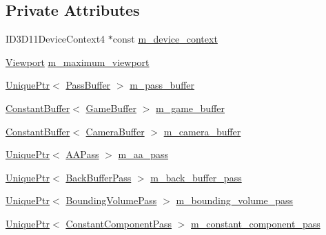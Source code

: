 \subsection*{Private Attributes}
\begin{DoxyCompactItemize}
\item 
I\+D3\+D11\+Device\+Context4 $\ast$const \hyperlink{classmage_1_1_renderer_ab4161386c4ddd51aa6d3299c10f1744a}{m\+\_\+device\+\_\+context}
\item 
\hyperlink{classmage_1_1_viewport}{Viewport} \hyperlink{classmage_1_1_renderer_a4a874bbe3cd4f19a16a65cca7bb93100}{m\+\_\+maximum\+\_\+viewport}
\item 
\hyperlink{namespacemage_a3316d7143a973e37adf1110f2e80ca31}{Unique\+Ptr}$<$ \hyperlink{structmage_1_1_pass_buffer}{Pass\+Buffer} $>$ \hyperlink{classmage_1_1_renderer_a304d7bdeb64906cb51f87443cf7201e1}{m\+\_\+pass\+\_\+buffer}
\item 
\hyperlink{structmage_1_1_constant_buffer}{Constant\+Buffer}$<$ \hyperlink{structmage_1_1_game_buffer}{Game\+Buffer} $>$ \hyperlink{classmage_1_1_renderer_abba23dce8a4946d352f901707900857b}{m\+\_\+game\+\_\+buffer}
\item 
\hyperlink{structmage_1_1_constant_buffer}{Constant\+Buffer}$<$ \hyperlink{structmage_1_1_camera_buffer}{Camera\+Buffer} $>$ \hyperlink{classmage_1_1_renderer_ac6ea5b2ff22e051400a693b3f98ef816}{m\+\_\+camera\+\_\+buffer}
\item 
\hyperlink{namespacemage_a3316d7143a973e37adf1110f2e80ca31}{Unique\+Ptr}$<$ \hyperlink{classmage_1_1_a_a_pass}{A\+A\+Pass} $>$ \hyperlink{classmage_1_1_renderer_a275986047921b355d94b1a7111df6665}{m\+\_\+aa\+\_\+pass}
\item 
\hyperlink{namespacemage_a3316d7143a973e37adf1110f2e80ca31}{Unique\+Ptr}$<$ \hyperlink{classmage_1_1_back_buffer_pass}{Back\+Buffer\+Pass} $>$ \hyperlink{classmage_1_1_renderer_a21db5f4d584b3325911d132d0022b856}{m\+\_\+back\+\_\+buffer\+\_\+pass}
\item 
\hyperlink{namespacemage_a3316d7143a973e37adf1110f2e80ca31}{Unique\+Ptr}$<$ \hyperlink{classmage_1_1_bounding_volume_pass}{Bounding\+Volume\+Pass} $>$ \hyperlink{classmage_1_1_renderer_a36271439a6217d1fd9b9162f5d90b738}{m\+\_\+bounding\+\_\+volume\+\_\+pass}
\item 
\hyperlink{namespacemage_a3316d7143a973e37adf1110f2e80ca31}{Unique\+Ptr}$<$ \hyperlink{classmage_1_1_constant_component_pass}{Constant\+Component\+Pass} $>$ \hyperlink{classmage_1_1_renderer_a263748ea2ded028b1885f122e62caf39}{m\+\_\+constant\+\_\+component\+\_\+pass}

\end{DoxyCompactItemize}

